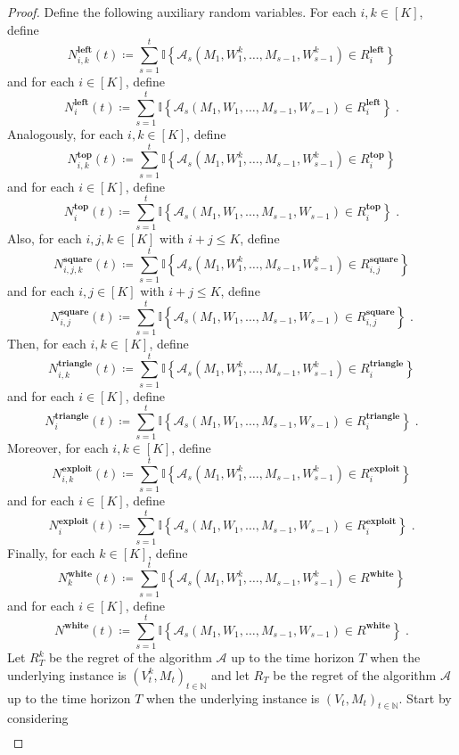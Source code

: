 \documentclass[final,12pt]{colt2025}
\newcommand{\cA}{\mathcal{A}}
\newcommand{\I}{\mathbb{I}}
\newcommand{\N}{\mathbb{N}}
\newcommand{\lcb}[1]{\left\{#1\right\}}
\newcommand{\nP}{M}
\newcommand{\nZ}{V}
\newcommand{\nW}{W}
\begin{document}
{\begin{proof}
Define the following auxiliary random variables.
For each $i,k \in [K]$, define
\[
    N^{\textbf{left}}_{i,k}(t) \coloneqq \sum_{s=1}^t \I\lcb{ \cA_s(\nP_1,\nW_1^k,\dots,\nP_{s-1},\nW_{s-1}^k) \in R^{\textbf{left}}_i }
\]
and for each $i \in [K]$, define
\[
    N^{\textbf{left}}_{i}(t) \coloneqq \sum_{s=1}^t \I\lcb{ \cA_s(\nP_1,\nW_1,\dots,\nP_{s-1},\nW_{s-1}) \in R^{\textbf{left}}_i }\;.
\]
Analogously, for each $i,k \in [K]$, define
\[
    N^{\textbf{top}}_{i,k}(t) \coloneqq \sum_{s=1}^t \I\lcb{ \cA_s(\nP_1,\nW_1^k,\dots,\nP_{s-1},\nW_{s-1}^k) \in R^{\textbf{top}}_i }
\]
and for each $i \in [K]$, define
\[
    N^{\textbf{top}}_{i}(t) \coloneqq \sum_{s=1}^t \I\lcb{ \cA_s(\nP_1,\nW_1,\dots,\nP_{s-1},\nW_{s-1}) \in R^{\textbf{top}}_i }\;.
\]
Also, for each $i,j,k \in [K]$ with $i+j\le K$, define
\[
    N^{\textbf{square}}_{i,j,k}(t) \coloneqq \sum_{s=1}^t \I\lcb{ \cA_s(\nP_1,\nW_1^k,\dots,\nP_{s-1},\nW_{s-1}^k) \in  R^{\textbf{square}}_{i,j} }
\]
and for each $i,j \in [K]$ with $i+j\le K$, define
\[
    N^{\textbf{square}}_{i,j}(t) \coloneqq \sum_{s=1}^t \I\lcb{ \cA_s(\nP_1,\nW_1,\dots,\nP_{s-1},\nW_{s-1}) \in R^{\textbf{square}}_{i,j}  }\;.
\]
Then, for each $i,k \in [K]$, define
\[
    N^{\textbf{triangle}}_{i,k}(t) \coloneqq \sum_{s=1}^t \I\lcb{ \cA_s(\nP_1,\nW_1^k,\dots,\nP_{s-1},\nW_{s-1}^k) \in R^{\textbf{triangle}}_{i}  }
\]
and for each $i \in [K]$, define
\[
    N^{\textbf{triangle}}_{i}(t) \coloneqq \sum_{s=1}^t \I\lcb{ \cA_s(\nP_1,\nW_1,\dots,\nP_{s-1},\nW_{s-1}) \in R^{\textbf{triangle}}_{i}  } \;.
\]
Moreover, for each $i,k \in [K]$, define
\[
    N^{\textbf{exploit}}_{i,k}(t) \coloneqq \sum_{s=1}^t \I\lcb{ \cA_s(\nP_1,\nW_1^k,\dots,\nP_{s-1},\nW_{s-1}^k) \in R^{\textbf{exploit}}_i }
\]
and for each $i \in [K]$, define
\[
    N^{\textbf{exploit}}_{i}(t) \coloneqq \sum_{s=1}^t \I\lcb{ \cA_s(\nP_1,\nW_1,\dots,\nP_{s-1},\nW_{s-1}) \in R^{\textbf{exploit}}_i }\;.
\]
Finally, for each $k \in [K]$, define
\[
    N^{\textbf{white}}_{k}(t) \coloneqq \sum_{s=1}^t \I\lcb{ \cA_s(\nP_1,\nW_1^k,\dots,\nP_{s-1},\nW_{s-1}^k) \in R^{\textbf{white}} }
\]
and for each $i \in [K]$, define
\[
    N^{\textbf{white}}(t) \coloneqq \sum_{s=1}^t \I\lcb{ \cA_s(\nP_1,\nW_1,\dots,\nP_{s-1},\nW_{s-1}) \in R^{\textbf{white}} }\;.
\]
Let $R^k_T$ be the regret of the algorithm $\cA$ up to the time horizon $T$ when the underlying instance is $(\nZ_t^k,\nP_t)_{t \in \N}$ and let $R_T$ be the regret of the algorithm $\cA$ up to the time horizon $T$ when the underlying instance is $(\nZ_t,\nP_t)_{t \in \N}$.
Start by considering
\begin{align*}

\end{align*}
\end{proof}}
\end{document}

